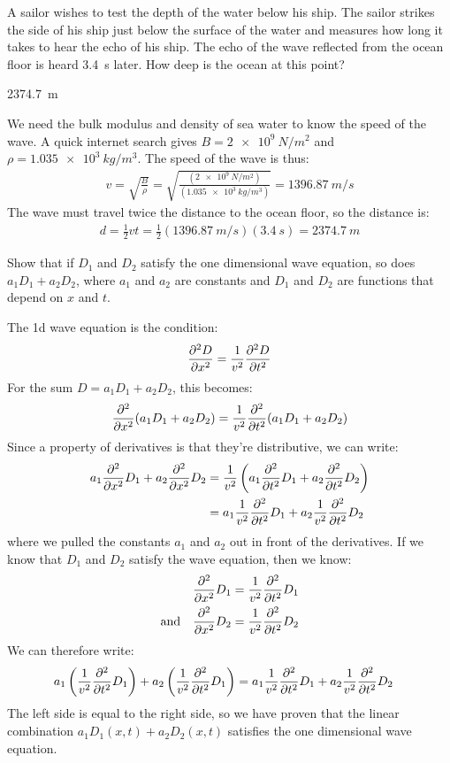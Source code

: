 \question A sailor wishes to test the depth of the water below his ship. The sailor strikes the side of his ship just below the surface of the water and measures how long it takes to hear the echo of his ship. The echo of the wave reflected from the ocean floor is heard \SI{3.4}{s} later. How deep is the ocean at this point?
\begin{finalanswer}
\SI{2374.7}{m}
\end{finalanswer}
\begin{solution}
We need the bulk modulus and density of sea water to know the speed of the wave. A quick internet search gives $B=\SI{2e9}{N/m^2}$ and $\rho=\SI{1.035e3}{kg/m^3}$. The speed of the wave is thus:
\begin{align*}
v=\sqrt{\frac{B}{\rho}}=\sqrt{\frac{(\SI{2e9}{N/m^2})}{(\SI{1.035e3}{kg/m^3})}}=\SI{1396.87}{m/s}
\end{align*}
The wave must travel twice the distance to the ocean floor, so the distance is:
\begin{align*}
d = \frac{1}{2}vt=\frac{1}{2}(\SI{1396.87}{m/s})(\SI{3.4}{s})=\SI{2374.7}{m}
\end{align*}
\end{solution}

\question Show that if $D_1$ and $D_2$ satisfy the one dimensional wave equation, so does $a_1D_1+a_2D_2$, where $a_1$ and $a_2$ are constants and $D_1$ and $D_2$ are functions that depend on $x$ and $t$.
\begin{solution}
The 1d wave equation is the condition:
\begin{align*}
\frac{\partial ^2D}{\partial x^2}=\frac{1}{v^2}\frac{\partial ^2D}{\partial t^2}
\end{align*}
For the sum $D=a_1D_1+a_2D_2$, this becomes:
\begin{align*}
\frac{\partial ^2}{\partial x^2}(a_1D_1+a_2D_2)=\frac{1}{v^2}\frac{\partial ^2}{\partial t^2}(a_1D_1+a_2D_2)
\end{align*}
Since a property of derivatives is that they're distributive, we can write:
\begin{align*}
a_1\frac{\partial ^2}{\partial x^2}D_1+a_2\frac{\partial ^2}{\partial x^2}D_2&=\frac{1}{v^2}\left( a_1\frac{\partial ^2}{\partial t^2}D_1+a_2\frac{\partial ^2}{\partial t^2}D_2\right)\\
&=a_1\frac{1}{v^2}\frac{\partial ^2}{\partial t^2}D_1+a_2\frac{1}{v^2}\frac{\partial ^2}{\partial t^2}D_2
\end{align*}
where we pulled the constants $a_1$ and $a_2$ out in front of the derivatives. If we know that $D_1$ and $D_2$ satisfy the wave equation, then we know:
\begin{align*}
\frac{\partial ^2}{\partial x^2}D_1&=\frac{1}{v^2}\frac{\partial ^2}{\partial t^2}D_1\\
\textrm{and} \quad \frac{\partial ^2}{\partial x^2}D_2&=\frac{1}{v^2}\frac{\partial ^2}{\partial t^2}D_2
\end{align*}
We can therefore write:
\begin{align*}
a_1\left( \frac{1}{v^2}\frac{\partial ^2}{\partial t^2}D_1\right)+a_2\left( \frac{1}{v^2}\frac{\partial ^2}{\partial t^2}D_1\right)
&=a_1\frac{1}{v^2}\frac{\partial ^2}{\partial t^2}D_1+a_2\frac{1}{v^2}\frac{\partial ^2}{\partial t^2}D_2
\end{align*}
The left side is equal to the right side, so we have proven that the linear combination $a_1D_1(x,t)+a_2D_2(x,t)$ satisfies the one dimensional wave equation.
\end{solution}

